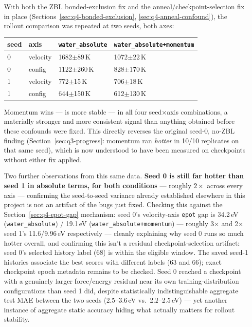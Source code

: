 \documentclass[11pt]{article}
\begin{document}
With both the ZBL bonded-exclusion fix and the anneal/checkpoint-selection
fix in place (Sections~\ref{sec:q4-bonded-exclusion},
\ref{sec:q4-anneal-confound}), the rollout comparison was repeated at two
seeds, both axes:

\begin{center}
\begin{tabular}{llll}
\toprule
seed & axis & \texttt{water\_absolute} & \texttt{water\_absolute+momentum} \\
\midrule
0 & velocity & 1682$\pm$89\,K & 1072$\pm$22\,K \\
0 & config   & 1122$\pm$260\,K & 828$\pm$170\,K \\
1 & velocity & 772$\pm$15\,K & 706$\pm$18\,K \\
1 & config   & 644$\pm$150\,K & 612$\pm$130\,K \\
\bottomrule
\end{tabular}
\end{center}

Momentum wins --- is more stable --- in all four seed$\times$axis
combinations, a materially stronger and more consistent signal than
anything obtained before these confounds were fixed. This directly
reverses the original seed-0, no-ZBL finding (Section~\ref{sec:q3-progress}:
momentum ran \emph{hotter} in 10/10 replicates on that same seed), which is
now understood to have been measured on checkpoints without either fix
applied.

Two further observations from this same data. \textbf{Seed 0 is still far
hotter than seed 1 in absolute terms, for both conditions} ---
roughly $2\times$ across every axis --- confirming the seed-to-seed
variance already established elsewhere in this project is not an artifact
of the bugs just fixed. Checking this against the Section~\ref{sec:q4-epot-gap}
mechanism: seed 0's velocity-axis \texttt{epot} gap is 34.2\,eV
(\texttt{water\_absolute}) / 19.1\,eV (\texttt{water\_absolute+momentum}) ---
roughly 3$\times$ and 2$\times$ seed 1's 11.6/9.96\,eV respectively ---
cleanly explaining why seed 0 runs so much hotter overall, and confirming
this isn't a residual checkpoint-selection artifact: seed 0's selected
history label (68) is within the eligible window. The saved seed-1
histories associate the best scores with different labels (63 and 66);
exact checkpoint epoch metadata remains to be checked. Seed 0 reached a checkpoint with a
genuinely larger force/energy residual near its own training-distribution
configurations than seed 1 did, despite statistically indistinguishable
aggregate test MAE between the two seeds (2.5--3.6\,eV vs.\ 2.2--2.5\,eV) ---
yet another instance of aggregate static accuracy hiding what actually
matters for rollout stability.
\end{document}
